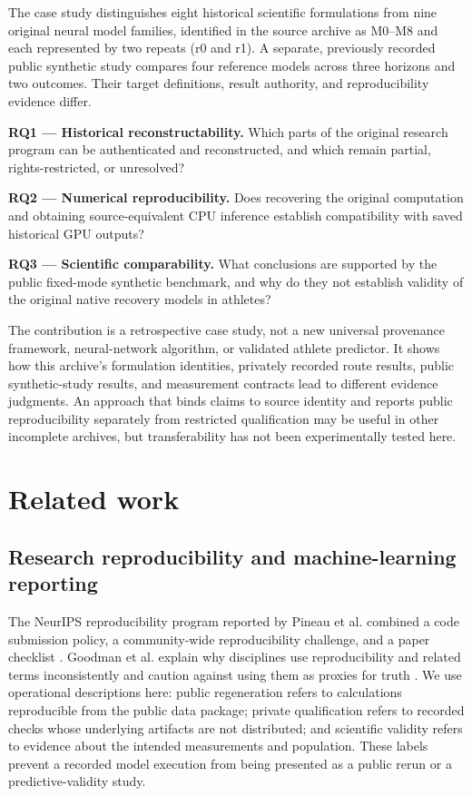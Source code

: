 \documentclass[12pt,a4paper]{article}
\begin{document}
The case study distinguishes eight historical scientific formulations from nine original neural model families, identified in the source archive as M0--M8 and each represented by two repeats (r0 and r1). A separate, previously recorded public synthetic study compares four reference models across three horizons and two outcomes. Their target definitions, result authority, and reproducibility evidence differ.

\noindent\textbf{RQ1 — Historical reconstructability.} Which parts of the original research program can be authenticated and reconstructed, and which remain partial, rights-restricted, or unresolved?

\noindent\textbf{RQ2 — Numerical reproducibility.} Does recovering the original computation and obtaining source-equivalent CPU inference establish compatibility with saved historical GPU outputs?

\noindent\textbf{RQ3 — Scientific comparability.} What conclusions are supported by the public fixed-mode synthetic benchmark, and why do they not establish validity of the original native recovery models in athletes?

The contribution is a retrospective case study, not a new universal provenance framework, neural-network algorithm, or validated athlete predictor. It shows how this archive's formulation identities, privately recorded route results, public synthetic-study results, and measurement contracts lead to different evidence judgments. An approach that binds claims to source identity and reports public reproducibility separately from restricted qualification may be useful in other incomplete archives, but transferability has not been experimentally tested here.

\section{Related work}

\subsection{Research reproducibility and machine-learning reporting}

The NeurIPS reproducibility program reported by Pineau et al. combined a code submission policy, a community-wide reproducibility challenge, and a paper checklist \cite{R9}. Goodman et al. explain why disciplines use reproducibility and related terms inconsistently and caution against using them as proxies for truth \cite{R15}. We use operational descriptions here: public regeneration refers to calculations reproducible from the public data package; private qualification refers to recorded checks whose underlying artifacts are not distributed; and scientific validity refers to evidence about the intended measurements and population. These labels prevent a recorded model execution from being presented as a public rerun or a predictive-validity study.
\end{document}
